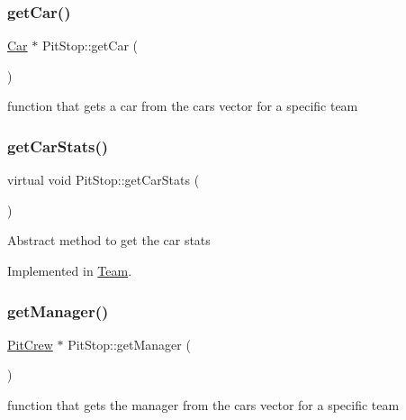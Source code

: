 \subsubsection{\texorpdfstring{get\+Car()}{getCar()}}
{\footnotesize\ttfamily \mbox{\hyperlink{class_car}{Car}} $\ast$ Pit\+Stop\+::get\+Car (\begin{DoxyParamCaption}{ }\end{DoxyParamCaption})\hspace{0.3cm}{\ttfamily [virtual]}}

function that gets a car from the cars vector for a specific team \mbox{\label{class_pit_stop_a3a1040306ad9a9e573f488dd2dfc319f}} 
\subsubsection{\texorpdfstring{get\+Car\+Stats()}{getCarStats()}}
{\footnotesize\ttfamily virtual void Pit\+Stop\+::get\+Car\+Stats (\begin{DoxyParamCaption}{ }\end{DoxyParamCaption})\hspace{0.3cm}{\ttfamily [pure virtual]}}

Abstract method to get the car stats 

Implemented in \mbox{\hyperlink{class_team_ac06b2e2837cace2a8aa9b579dcd69a52}{Team}}.

\mbox{\label{class_pit_stop_a5d0d8b1ce50db452fb1d22292f9d1d9d}} 
\subsubsection{\texorpdfstring{get\+Manager()}{getManager()}}
{\footnotesize\ttfamily \mbox{\hyperlink{class_pit_crew}{Pit\+Crew}} $\ast$ Pit\+Stop\+::get\+Manager (\begin{DoxyParamCaption}{ }\end{DoxyParamCaption})}

function that gets the manager from the cars vector for a specific team \mbox{\label{class_pit_stop_a83212e8030b8931a3129a565089d76ce}} 
